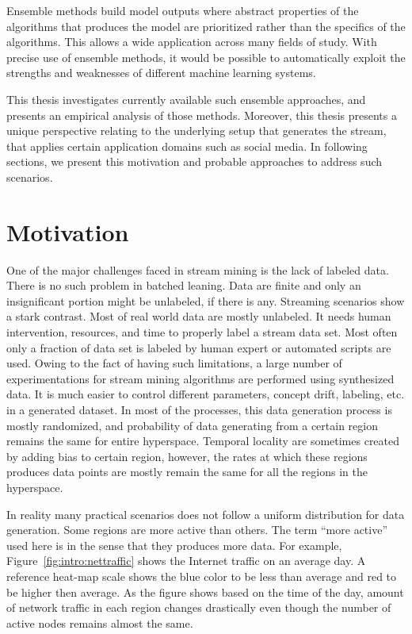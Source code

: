 Ensemble methods build model outputs where abstract properties of the algorithms that produces the model are prioritized rather than the specifics of the algorithms. This allows a wide application across many fields of study. With precise use of ensemble methods, it would be possible to automatically exploit the strengths and weaknesses of different machine learning systems.

This thesis investigates currently available such ensemble approaches, and presents an empirical analysis of those methods. Moreover, this thesis presents a unique perspective relating to the underlying setup that generates the stream, that applies certain application domains such as social media. In following sections, we present this motivation and probable approaches to address such scenarios.

\section{Motivation}
\label{sec:intro:motiv}
One of the major challenges faced in stream mining is the lack of labeled data. There is no such problem in batched leaning. Data are finite and only an insignificant portion might be unlabeled, if there is any. Streaming scenarios show a stark contrast. Most of real world data are mostly unlabeled. It needs human intervention, resources, and time to properly label a stream data set. Most often only a fraction of data set is labeled by human expert or automated scripts are used. Owing to the fact of having such limitations, a large number of experimentations for stream mining algorithms are performed using synthesized data. It is much easier to control different parameters, concept drift, labeling, etc. in a generated dataset. In most of the processes, this data generation process is mostly randomized, and probability of data generating from a certain region remains the same for entire hyperspace. Temporal locality are sometimes created by adding bias to certain region, however, the rates at which these regions produces data points are mostly remain the same for all the regions in the hyperspace.

In reality many practical scenarios does not follow a uniform distribution for data generation. Some regions are more active than others. The term ``more active'' used here is in the sense that they produces more data. For example, Figure~\ref{fig:intro:nettraffic} shows the Internet traffic on an average day. A reference heat-map scale shows the blue color to be less than average and red to be higher then average. As the figure shows based on the time of the day, amount of network traffic in each region changes drastically even though the number of active nodes remains almost the same.

